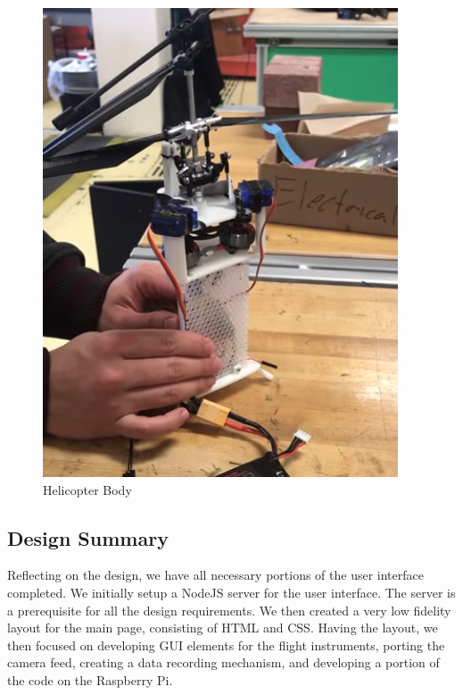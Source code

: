 \documentclass[onecolumn, oneside, letterpaper, draftclsnofoot, 10pt, compsoc]{IEEEtran}
\begin{document}
\begin{figure}[H]
    \centering
    \includegraphics{graphics/Helicopter.PNG}
    \caption{Helicopter Body}
    \label{fig:heli}
\end{figure}

\subsection{Design Summary}
\noindent
Reflecting on the design, we have all necessary portions of the user interface completed. We initially setup a NodeJS server for the user interface. The server is a prerequisite for all the design requirements. We then created a very low fidelity layout for the main page, consisting of HTML and CSS. Having the layout, we then focused on developing GUI elements for the flight instruments, porting the camera feed, creating a data recording mechanism, and developing a portion of the code on the Raspberry Pi.
\end{document}
